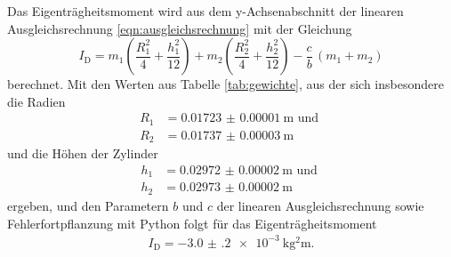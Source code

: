 Das Eigenträgheitsmoment wird aus dem y-Achsenabschnitt der linearen
Ausgleichsrechnung \eqref{eqn:ausgleichsrechnung} mit der Gleichung
\begin{equation}
  I_\text{D} = m_1\left(\frac{R_1^2}{4} + \frac{h_1^2}{12}\right) + m_2 \left(
  \frac{R_2^2}{4}+\frac{h_2^2}{12}\right) - \frac{c}{b}\, (m_1 + m_2)
  \label{eqn:eigentraegheitsmoment}
\end{equation}
berechnet. Mit den Werten aus Tabelle \ref{tab:gewichte}, aus der sich insbesondere
die Radien
\begin{align*}
  R_1 &= \SI{0.01723(1)}{\meter} \text{ und }\\
  R_2 &= \SI{0.01737(3)}{\meter}
\end{align*}
und die Höhen der Zylinder
\begin{align*}
  h_1 &= \SI{0.02972(2)}{\meter} \text{ und } \\
  h_2 &= \SI{0.02973(2)}{\meter}
\end{align*}
ergeben, und den Parametern $b$ und $c$ der linearen Ausgleichsrechnung sowie
Fehlerfortpflanzung mit Python folgt für das Eigenträgheitsmoment
\begin{align*}
  I_\text{D} = \SI{-3.0(2)e-3}{\kilo\gram\squared\meter}.
\end{align*}

